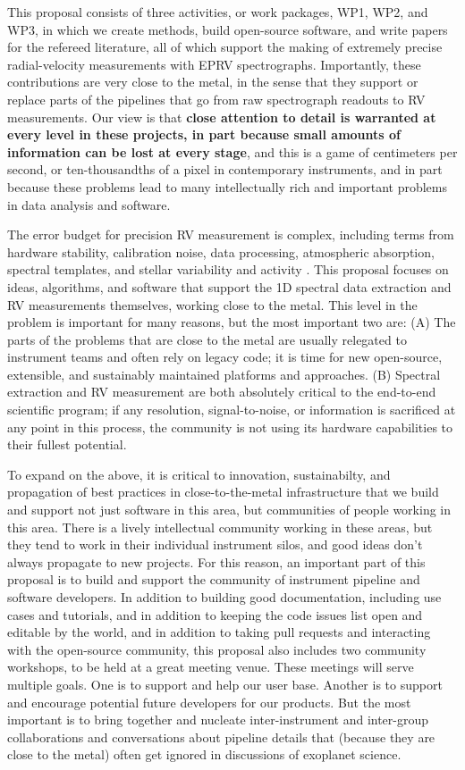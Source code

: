 \documentclass[12pt]{article}
\begin{document}
This proposal consists of three activities, or work packages, WP1, WP2, and WP3, in which we create methods, build open-source software, and write papers for the refereed literature, all of which support the making of extremely precise radial-velocity measurements with EPRV spectrographs.
Importantly, these contributions are very close to the metal, in the sense that they support or replace parts of the pipelines that go from raw spectrograph readouts to RV measurements.
Our view is that \textbf{close attention to detail is warranted at every level in these projects, in part because small amounts of information can be lost at every stage}, and this is a game of centimeters per second, or ten-thousandths of a pixel in contemporary instruments, and in part because these problems lead to many intellectually rich and important problems in data analysis and software.

The error budget for precision RV measurement is complex, including terms from hardware stability, calibration noise, data processing, atmospheric absorption, spectral templates, and stellar variability and activity \cite[eg,][]{Halverson}. This proposal focuses on ideas, algorithms, and software that support the 1D spectral data extraction and RV measurements themselves, working close to the metal. This level in the problem is important for many reasons, but the most important two are: (A) The parts of the problems that are close to the metal are usually relegated to instrument teams and often rely on legacy code; it is time for new open-source, extensible, and sustainably maintained platforms and approaches. (B) Spectral extraction and RV measurement are both absolutely critical to the end-to-end scientific program; if any resolution, signal-to-noise, or information is sacrificed at any point in this process, the community is not using its hardware capabilities to their fullest potential.

To expand on the above, it is critical to innovation, sustainabilty, and propagation of best practices in close-to-the-metal infrastructure that we build and support not just software in this area, but communities of people working in this area.
There is a lively intellectual community working in these areas, but they tend to work in their individual instrument silos, and good ideas don't always propagate to new projects.
For this reason, an important part of this proposal is to build and support the community of instrument pipeline and software developers.
In addition to building good documentation, including use cases and tutorials, and in addition to keeping the code issues list open and editable by the world, and in addition to taking pull requests and interacting with the open-source community, this proposal also includes two community workshops, to be held at a great meeting venue.
These meetings will serve multiple goals.
One is to support and help our user base.
Another is to support and encourage potential future developers for our products.
But the most important is to bring together and nucleate inter-instrument and inter-group collaborations and conversations about pipeline details that (because they are close to the metal) often get ignored in discussions of exoplanet science.
\end{document}

